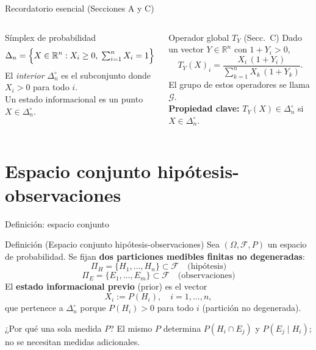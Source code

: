 \documentclass[12pt, aspectratio=169]{beamer}
\newcommand{\R}{\mathbb{R}}
\newcommand{\Dn}{\Delta_n}
\newcommand{\Dni}{\Delta_n^\circ}
\begin{document}
\begin{frame}{Recordatorio esencial (Secciones A y C)}

  \begin{columns}[T]
    \begin{block}{Símplex de probabilidad}
      \[
        \Dn = \Bigl\{ X \in \R^n : X_i \ge 0,\;
              \textstyle\sum_{i=1}^n X_i = 1 \Bigr\}
      \]
      El \emph{interior} $\Dni$ es el subconjunto donde $X_i > 0$ para todo $i$.\\[4pt]
      Un estado informacional es un punto $X \in \Dni$.
    \end{block}

    \begin{block}{Operador global $T_Y$ (Secc.\ C)}
      Dado un vector $Y \in \R^n$ con $1 + Y_i > 0$,
      \[
        T_Y(X)_i
        = \frac{X_i\,(1+Y_i)}{\displaystyle\sum_{k=1}^n X_k\,(1+Y_k)}.
      \]
      El grupo de estos operadores se llama $\mathcal{G}$.\\[4pt]
      \textbf{Propiedad clave:} $T_Y(X) \in \Dni$ si $X \in \Dni$.
    \end{block}
  \end{columns}
\end{frame}

\section{Espacio conjunto hipótesis-observaciones}

\begin{frame}{Definición: espacio conjunto}

  \begin{block}{Definición (Espacio conjunto hipótesis-observaciones)}
    Sea $(\Omega, \mathcal{F}, P)$ un espacio de probabilidad.
    Se fijan \textbf{dos particiones medibles finitas no degeneradas}:
    \[
      \Pi_H = \{H_1, \dots, H_n\} \subset \mathcal{F}
      \quad \text{(hipótesis)}
    \]
    \[
      \Pi_E = \{E_1, \dots, E_m\} \subset \mathcal{F}
      \quad \text{(observaciones)}
    \]
    El \textbf{estado informacional previo} (prior) es el vector
    \[
      X_i := P(H_i), \quad i = 1, \dots, n,
    \]
    que pertenece a $\Dni$ porque $P(H_i) > 0$ para todo $i$
    (partición no degenerada).
  \end{block}

  \begin{exampleblock}{¿Por qué una sola medida $P$?}
    El mismo $P$ determina $P(H_i \cap E_j)$ y $P(E_j \mid H_i)$;
    no se necesitan medidas adicionales.
  \end{exampleblock}
\end{frame}
\end{document}
